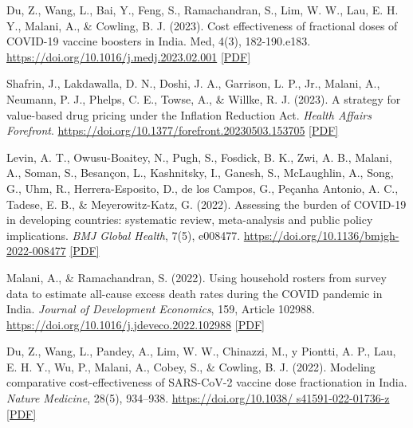 \begin{tablist}
        \item[2023] \tab{}Du, Z., Wang, L., Bai, Y., Feng, S., Ramachandran, S., Lim, W. W., Lau, E. H. Y., Malani, A., \& Cowling, B. J. (2023). Cost effectiveness of fractional doses of COVID-19 vaccine boosters in India. Med, 4(3), 182-190.e183. \href{https://doi.org/10.1016/j.medj.2023.02.001}{https://doi.org/10.1016/j.medj.2023.02.001} \href{https://github.com/anup-malani/website_personal/blob/main/publications/2023_DuMalaniEtAl_Med_CoestEffectiveFractionalDoses.pdf}{[PDF]} 

        \item[2023] \tab{}Shafrin, J., Lakdawalla, D. N., Doshi, J. A., Garrison, L. P., Jr., Malani, A., Neumann, P. J., Phelps, C. E., Towse, A., \& Willke, R. J. (2023). A strategy for value-based drug pricing under the Inflation Reduction Act. \textit{Health Affairs Forefront}. \href{https://doi.org/10.1377/forefront.20230503.153705}{https://doi.org/10.1377/forefront.20230503.153705} \href{https://github.com/anup-malani/website_personal/blob/main/publications/2023_ShafrinMalaniEtAl_HealthAffairs_IRAValuePricing.pdf}{[PDF]}

        \item[2022] \tab{}Levin, A. T., Owusu-Boaitey, N., Pugh, S., Fosdick, B. K., Zwi, A. B., Malani, A., Soman, S., Besançon, L., Kashnitsky, I., Ganesh, S., McLaughlin, A., Song, G., Uhm, R., Herrera-Esposito, D., de los Campos, G., Peçanha Antonio, A. C., Tadese, E. B., \& Meyerowitz-Katz, G. (2022). Assessing the burden of COVID-19 in developing countries: systematic review, meta-analysis and public policy implications. \textit{BMJ Global Health}, 7(5), e008477. \href{https://doi.org/10.1136/bmjgh-2022-008477}{https://doi.org/10.1136/bmjgh-2022-008477} \href{https://github.com/anup-malani/website_personal/blob/main/publications/2022_LevinMalaniEtAl_BMJGlobalHealth_COVIDMortalityDeveloping%20Countries.pdf}{[PDF]} 

        \item[2022] \tab{}Malani, A., \& Ramachandran, S. (2022). Using household rosters from survey data to estimate all-cause excess death rates during the COVID pandemic in India. \textit{Journal of Development Economics}, 159, Article 102988. \href{https://doi.org/10.1016/j.jdeveco.2022.102988}{https://doi.org/10.1016/j.jdeveco.2022.102988} \href{https://github.com/anup-malani/website_personal/blob/main/publications/2022_MalaniRamachandran_JDE_MortalityCOVID.pdf}{[PDF]}
        
        \item[2022] \tab{}Du, Z., Wang, L., Pandey, A., Lim, W. W., Chinazzi, M., y Piontti, A. P., Lau, E. H. Y., Wu, P., Malani, A., Cobey, S., \& Cowling, B. J. (2022). Modeling comparative cost-effectiveness of SARS-CoV-2 vaccine dose fractionation in India. \textit{Nature Medicine}, 28(5), 934–938. \href{https://doi.org/10.1038/s41591-022-01736-z}{https://doi.org/10.1038/ s41591-022-01736-z} \href{https://github.com/anup-malani/website_personal/blob/main/publications/2022_DuMalaniEtAl_NatureMed_DoseFractionation.pdf}{[PDF]}
        

\end{tablist}
